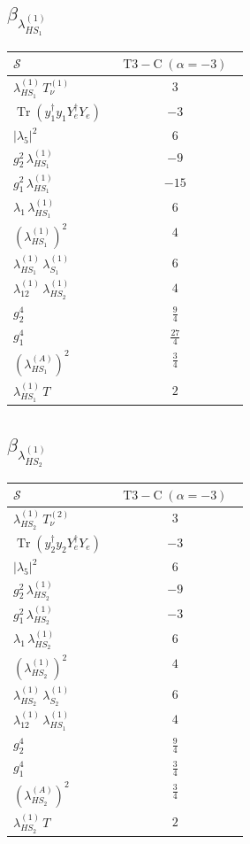 \documentclass[9pt]{article}
\begin{document}
\subsection*{$ \beta_{\lambda_{HS_1}^{(1)}} $}
\begin{longtable}{@{}p{0.31\linewidth}c@{}}
\toprule
$\mathcal{S}$ & $ \mathrm{T3-C}\;(\alpha=-3) $ \\
\midrule
$ \lambda_{HS_1}^{(1)}\,T_{\nu}^{(1)} $ & $ 3 $ \\
$ \operatorname{Tr}(y_1^\dagger y_1Y_e^\dagger Y_e) $ & $ -3 $ \\
$ |\lambda_5|^2 $ & $ 6 $ \\
$ g_2^2\,\lambda_{HS_1}^{(1)} $ & $ -9 $ \\
$ g_1^2\,\lambda_{HS_1}^{(1)} $ & $ -15 $ \\
$ \lambda_1\,\lambda_{HS_1}^{(1)} $ & $ 6 $ \\
$ \left(\lambda_{HS_1}^{(1)}\right)^2 $ & $ 4 $ \\
$ \lambda_{HS_1}^{(1)}\,\lambda_{S_1}^{(1)} $ & $ 6 $ \\
$ \lambda_{12}^{(1)}\,\lambda_{HS_2}^{(1)} $ & $ 4 $ \\
$ g_2^4 $ & $ \frac{9}{4} $ \\
$ g_1^4 $ & $ \frac{27}{4} $ \\
$ \left(\lambda_{HS_1}^{(A)}\right)^2 $ & $ \frac{3}{4} $ \\
$ \lambda_{HS_1}^{(1)}\,T $ & $ 2 $ \\
\bottomrule
\end{longtable}
\subsection*{$ \beta_{\lambda_{HS_2}^{(1)}} $}
\begin{longtable}{@{}p{0.31\linewidth}c@{}}
\toprule
$\mathcal{S}$ & $ \mathrm{T3-C}\;(\alpha=-3) $ \\
\midrule
$ \lambda_{HS_2}^{(1)}\,T_{\nu}^{(2)} $ & $ 3 $ \\
$ \operatorname{Tr}(y_2^\dagger y_2Y_e^\dagger Y_e) $ & $ -3 $ \\
$ |\lambda_5|^2 $ & $ 6 $ \\
$ g_2^2\,\lambda_{HS_2}^{(1)} $ & $ -9 $ \\
$ g_1^2\,\lambda_{HS_2}^{(1)} $ & $ -3 $ \\
$ \lambda_1\,\lambda_{HS_2}^{(1)} $ & $ 6 $ \\
$ \left(\lambda_{HS_2}^{(1)}\right)^2 $ & $ 4 $ \\
$ \lambda_{HS_2}^{(1)}\,\lambda_{S_2}^{(1)} $ & $ 6 $ \\
$ \lambda_{12}^{(1)}\,\lambda_{HS_1}^{(1)} $ & $ 4 $ \\
$ g_2^4 $ & $ \frac{9}{4} $ \\
$ g_1^4 $ & $ \frac{3}{4} $ \\
$ \left(\lambda_{HS_2}^{(A)}\right)^2 $ & $ \frac{3}{4} $ \\
$ \lambda_{HS_2}^{(1)}\,T $ & $ 2 $ \\
\bottomrule
\end{longtable}
\end{document}
